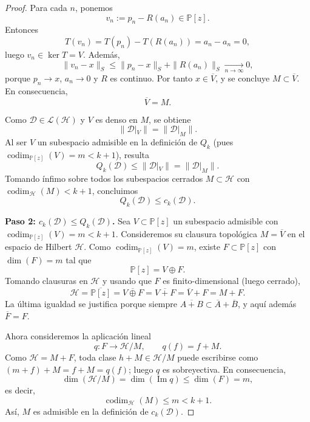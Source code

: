 \documentclass[12pt,a4paper]{article}
\theoremstyle{definition}
\theoremstyle{remark}
\newcommand{\Poly}{\mathbb{P}[z]}
\newcommand{\D}{\mathcal{D}}
\begin{document}
\begin{proof}
  Para cada $n$, ponemos
  \[
    v_n:=p_n-R(a_n)\in\Poly.
  \]
  Entonces
  \[
    T(v_n)=T(p_n)-T(R(a_n))=a_n-a_n=0,
  \]
  luego $v_n\in\ker T=V$. Además,
  \[
    \|v_n-x\|_S\le \|p_n-x\|_S+\|R(a_n)\|_S\xrightarrow[n\to\infty]{}0,
  \]
  porque $p_n\to x$, $a_n\to0$ y $R$ es continuo. Por tanto $x\in\overline V$, y se concluye $M\subset\overline V$. En consecuencia,
  \[
    \overline V=M.
  \]

  Como $\D\in\mathcal L(\mathcal H)$ y $V$ es denso en $M$, se obtiene
  \[
    \|\D|_V\|=\|\D|_M\|.
  \]
  Al ser $V$ un subespacio admisible en la definición de $Q_k$ (pues $\operatorname{codim}_{\Poly}(V)=m<k+1$), resulta
  \[
    Q_k(\D)\le \|\D|_V\|=\|\D|_M\|.
  \]
  Tomando ínfimo sobre todos los subespacios cerrados $M\subset\mathcal H$ con $\operatorname{codim}_{\mathcal H}(M)<k+1$, concluimos
  \[
    Q_k(\D)\le c_k(\D).
  \]

  \textbf{Paso 2: $c_k(\D) \le Q_k(\D)$.}
  Sea $V \subset \Poly$ un subespacio admisible con $\operatorname{codim}_{\Poly}(V) = m < k+1$. Consideremos su clausura topológica $M = \overline{V}$ en el espacio de Hilbert $\mathcal{H}$.
  Como $\operatorname{codim}_{\Poly}(V)=m$, existe $F\subset\Poly$ con $\dim(F)=m$ tal que
  \[
    \Poly=V\oplus F.
  \]
  Tomando clausuras en $\mathcal{H}$ y usando que $F$ es finito-dimensional (luego cerrado),
  \[
    \mathcal{H}=\overline{\Poly}=\overline{V\oplus F}=\overline{V+F}=\overline V+F=M+F.
  \]
  La última igualdad se justifica porque siempre $\overline{A+B}\subset \overline A+\overline B$, y aquí además $\overline F=F$.

  Ahora consideremos la aplicación lineal
  \[
    q:F\to \mathcal H/M,\qquad q(f)=f+M.
  \]
  Como $\mathcal H=M+F$, toda clase $h+M\in\mathcal H/M$ puede escribirse como $(m+f)+M=f+M=q(f)$; luego $q$ es sobreyectiva. En consecuencia,
  \[
    \dim(\mathcal{H}/M)=\dim(\operatorname{Im}q)\le \dim(F)=m,
  \]
  es decir,
  \[
    \operatorname{codim}_{\mathcal{H}}(M)\le m<k+1.
  \]
  Así, $M$ es admisible en la definición de $c_k(\D)$.


\end{proof}
\end{document}
